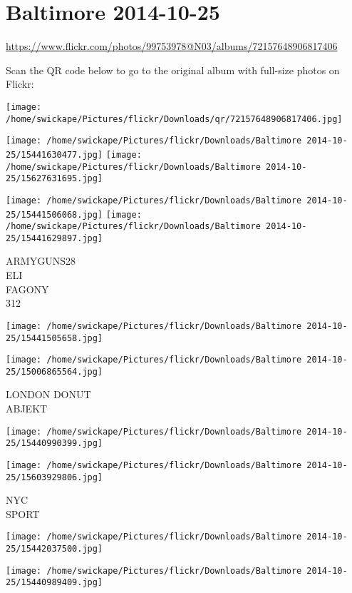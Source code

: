 \documentclass[10pt,letterpaper]{article}
\title{}
\author{}
\date{}
\begin{document}
\section*{Baltimore 2014-10-25}

\url{https://www.flickr.com/photos/99753978@N03/albums/72157648906817406}

Scan the QR code below to go to the original album with full-size photos on Flickr:

\texttt{[image: /home/swickape/Pictures/flickr/Downloads/qr/72157648906817406.jpg]}
\pagebreak

\texttt{[image: /home/swickape/Pictures/flickr/Downloads/Baltimore 2014-10-25/15441630477.jpg]}
\texttt{[image: /home/swickape/Pictures/flickr/Downloads/Baltimore 2014-10-25/15627631695.jpg]}

\texttt{[image: /home/swickape/Pictures/flickr/Downloads/Baltimore 2014-10-25/15441506068.jpg]}
\texttt{[image: /home/swickape/Pictures/flickr/Downloads/Baltimore 2014-10-25/15441629897.jpg]}

ARMYGUNS28\\
ELI\\
FAGONY\\
312
\pagebreak

\texttt{[image: /home/swickape/Pictures/flickr/Downloads/Baltimore 2014-10-25/15441505658.jpg]}

\vspace{0.25in}
\texttt{[image: /home/swickape/Pictures/flickr/Downloads/Baltimore 2014-10-25/15006865564.jpg]}

LONDON DONUT\\
ABJEKT
\pagebreak

\texttt{[image: /home/swickape/Pictures/flickr/Downloads/Baltimore 2014-10-25/15440990399.jpg]}

\vspace{0.25in}
\texttt{[image: /home/swickape/Pictures/flickr/Downloads/Baltimore 2014-10-25/15603929806.jpg]}

NYC\\
SPORT
\pagebreak

\texttt{[image: /home/swickape/Pictures/flickr/Downloads/Baltimore 2014-10-25/15442037500.jpg]}

\vspace{0.25in}
\texttt{[image: /home/swickape/Pictures/flickr/Downloads/Baltimore 2014-10-25/15440989409.jpg]}
\end{document}
